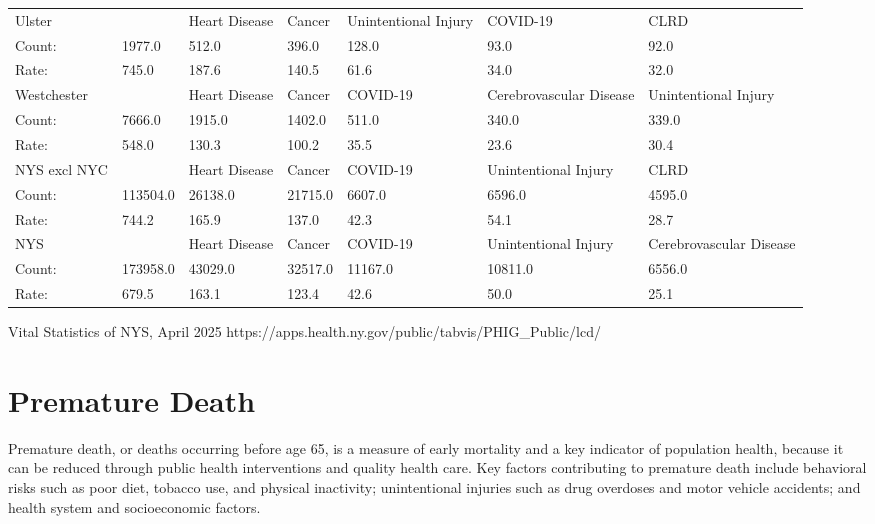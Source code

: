\documentclass[
  english,
  letterpaper,
]{report}
\begin{document}
\begin{longtable}[]{@{}lllllll@{}}
Ulster & & Heart Disease & Cancer & Unintentional Injury & COVID-19 &
CLRD \\
Count: & 1977.0 & 512.0 & 396.0 & 128.0 & 93.0 & 92.0 \\
Rate: & 745.0 & 187.6 & 140.5 & 61.6 & 34.0 & 32.0 \\
Westchester & & Heart Disease & Cancer & COVID-19 & Cerebrovascular
Disease & Unintentional Injury \\
Count: & 7666.0 & 1915.0 & 1402.0 & 511.0 & 340.0 & 339.0 \\
Rate: & 548.0 & 130.3 & 100.2 & 35.5 & 23.6 & 30.4 \\
NYS excl NYC & & Heart Disease & Cancer & COVID-19 & Unintentional
Injury & CLRD \\
Count: & 113504.0 & 26138.0 & 21715.0 & 6607.0 & 6596.0 & 4595.0 \\
Rate: & 744.2 & 165.9 & 137.0 & 42.3 & 54.1 & 28.7 \\
NYS & & Heart Disease & Cancer & COVID-19 & Unintentional Injury &
Cerebrovascular Disease \\
Count: & 173958.0 & 43029.0 & 32517.0 & 11167.0 & 10811.0 & 6556.0 \\
Rate: & 679.5 & 163.1 & 123.4 & 42.6 & 50.0 & 25.1 \\

\end{longtable}

\begin{tcolorbox}[enhanced jigsaw, breakable, leftrule=.75mm, title=\textcolor{quarto-callout-note-color}{\faInfo}\hspace{0.5em}{Source}, bottomrule=.15mm, opacityback=0, left=2mm, colback=white, bottomtitle=1mm, coltitle=black, colbacktitle=quarto-callout-note-color!10!white, colframe=quarto-callout-note-color-frame, opacitybacktitle=0.6, toptitle=1mm, titlerule=0mm, arc=.35mm, rightrule=.15mm, toprule=.15mm]

Vital Statistics of NYS, April 2025
https://apps.health.ny.gov/public/tabvis/PHIG\_Public/lcd/

\end{tcolorbox}

\section{Premature Death}\label{premature-death}

Premature death, or deaths occurring before age 65, is a measure of
early mortality and a key indicator of population health, because it can
be reduced through public health interventions and quality health care.
Key factors contributing to premature death include behavioral risks
such as poor diet, tobacco use, and physical inactivity; unintentional
injuries such as drug overdoses and motor vehicle accidents; and health
system and socioeconomic factors.
\end{document}
